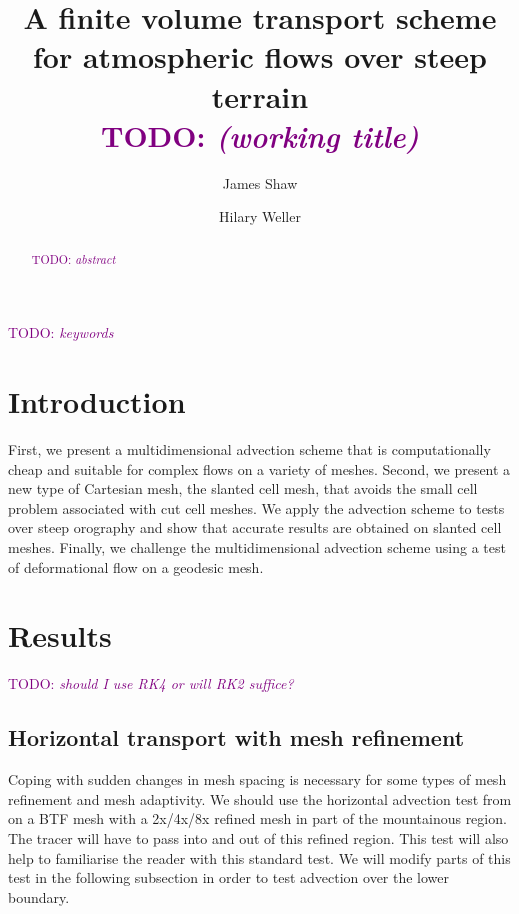 \documentclass[times]{elsarticle}
\newcommand{\TODO}[1]{\textcolor{purple}{TODO: \emph{#1}}}
\begin{document}
\begin{frontmatter}
\title{A finite volume transport scheme for atmospheric flows over steep terrain \\ \TODO{(working title)}}
\author[uor]{James Shaw}
\author[uor]{Hilary Weller}

\address[uor]{Department of Meteorology, University of Reading, Reading, United Kingdom}

\begin{abstract}
	\TODO{abstract}
\end{abstract}

\begin{keyword}
	\TODO{keywords}
\end{keyword}
\end{frontmatter}

\section{Introduction}

First, we present a multidimensional advection scheme that is computationally cheap and suitable for complex flows on a variety of meshes.  Second, we present a new type of Cartesian mesh, the slanted cell mesh, that avoids the small cell problem associated with cut cell meshes.   We apply the advection scheme to tests over steep orography and show that accurate results are obtained on slanted cell meshes.  Finally, we challenge the multidimensional advection scheme using a test of deformational flow on a geodesic mesh.





\section{Results}
\TODO{should I use RK4 or will RK2 suffice?}

\subsection{Horizontal transport with mesh refinement}
Coping with sudden changes in mesh spacing is necessary for some types of mesh refinement and mesh adaptivity.  We should use the horizontal advection test from \citet{schaer2002} on a BTF mesh with a 2x/4x/8x refined mesh in part of the mountainous region.  The tracer will have to pass into and out of this refined region.  This test will also help to familiarise the reader with this standard test.  We will modify parts of this test in the following subsection in order to test advection over the lower boundary.
\end{document}
